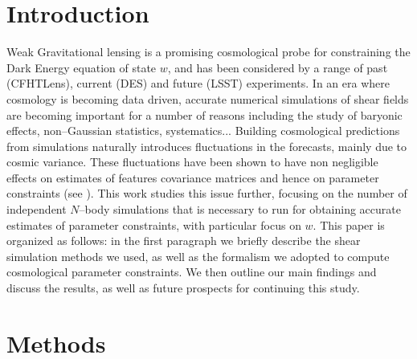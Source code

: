 \documentclass[reprint,aps,prd,superscriptaddress,showkeys,showpacs]{revtex4-1}
\begin{document}
\section{Introduction}
%
Weak Gravitational lensing is a promising cosmological probe for constraining the Dark Energy equation of state $w$, and has been considered by a range of past (CFHTLens), current (DES) and future (LSST) experiments. In an era where cosmology is becoming data driven, accurate numerical simulations of shear fields are becoming important for a number of reasons including the study of baryonic effects, non--Gaussian statistics, systematics... Building cosmological predictions from simulations naturally introduces fluctuations in the forecasts, mainly due to cosmic variance. These fluctuations have been shown to have non negligible effects on estimates of features covariance matrices and hence on parameter constraints (see \citep{DodelsonSchneider13}). This work studies this issue further, focusing on the number of independent $N$--body simulations that is necessary to run for obtaining accurate estimates of parameter constraints, with particular focus on $w$. This paper is organized as follows: in the first paragraph we briefly describe the shear simulation methods we used, as well as the formalism we adopted to compute cosmological parameter constraints. We then outline our main findings and discuss the results, as well as future prospects for continuing this study.  


\section{Methods}
\end{document}
